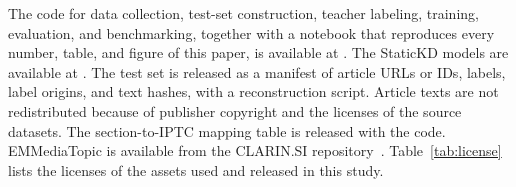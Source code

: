 The code for data collection, test-set construction, teacher labeling, training, evaluation, and benchmarking, together with a notebook that reproduces every number, table, and figure of this paper, is available at . The StaticKD models are available at . The test set is released as a manifest of article URLs or IDs, labels, label origins, and text hashes, with a reconstruction script. Article texts are not redistributed because of publisher copyright and the licenses of the source datasets. The section-to-IPTC mapping table is released with the code. EMMediaTopic is available from the CLARIN.SI repository~\cite{emmediatopic2025}. Table~\ref{tab:license} lists the licenses of the assets used and released in this study.

\TabLicense
